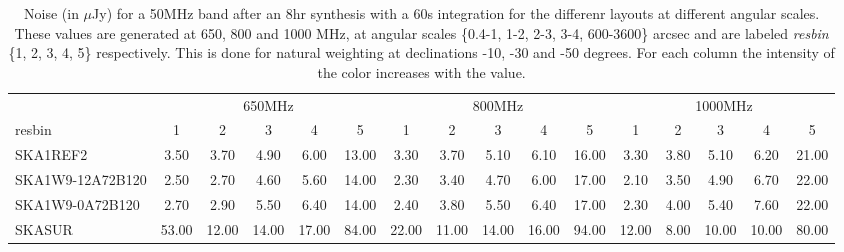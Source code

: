 \begin{table}[!htp]
{{\begin{tabular}{|lccccc||ccccc||ccccc|}
 \tabularnewline \cline{2-16} \multicolumn{1}{c}{ } & \multicolumn{5}{|c}{650MHz}  & \multicolumn{5}{c}{800MHz}  & \multicolumn{5}{c|}{1000MHz} \tabularnewline \cline{1-16} 
 resbin  &1 & 2 & 3 & 4 & 5 & 1 & 2 & 3 & 4 & 5 & 1 & 2 & 3 & 4 & 5 \tabularnewline \hline
SKA1REF2 & 3.50 \cellcolor{blue!18.83} & 3.70 \cellcolor{red!22.52} & 4.90 \cellcolor{green!19.34} & 6.00 \cellcolor{orange!19.47} & 13.00 \cellcolor{purple!18.00} & 3.30 \cellcolor{blue!20.13} & 3.70 \cellcolor{red!19.66} & 5.10 \cellcolor{green!19.81} & 6.10 \cellcolor{orange!18.42} & 16.00 \cellcolor{purple!18.00} & 3.30 \cellcolor{blue!23.09} & 3.80 \cellcolor{red!20.80} & 5.10 \cellcolor{green!19.65} & 6.20 \cellcolor{orange!18.00} & 21.00 \cellcolor{purple!18.00}\\ \hline 
SKA1W9-12A72B120 & 2.50 \cellcolor{blue!18.00} & 2.70 \cellcolor{red!18.00} & 4.60 \cellcolor{green!18.00} & 5.60 \cellcolor{orange!18.00} & 14.00 \cellcolor{purple!18.59} & 2.30 \cellcolor{blue!18.00} & 3.40 \cellcolor{red!18.00} & 4.70 \cellcolor{green!18.00} & 6.00 \cellcolor{orange!18.00} & 17.00 \cellcolor{purple!18.54} & 2.10 \cellcolor{blue!18.00} & 3.50 \cellcolor{red!18.00} & 4.90 \cellcolor{green!18.00} & 6.70 \cellcolor{orange!23.53} & 22.00 \cellcolor{purple!18.71}\\ \hline 
SKA1W9-0A72B120 & 2.70 \cellcolor{blue!18.17} & 2.90 \cellcolor{red!18.90} & 5.50 \cellcolor{green!22.02} & 6.40 \cellcolor{orange!20.95} & 14.00 \cellcolor{purple!18.59} & 2.40 \cellcolor{blue!18.21} & 3.80 \cellcolor{red!20.21} & 5.50 \cellcolor{green!21.61} & 6.40 \cellcolor{orange!19.68} & 17.00 \cellcolor{purple!18.54} & 2.30 \cellcolor{blue!18.85} & 4.00 \cellcolor{red!22.67} & 5.40 \cellcolor{green!22.12} & 7.60 \cellcolor{orange!33.47} & 22.00 \cellcolor{purple!18.71}\\ \hline 
SKASUR & 53.00 \cellcolor{blue!60.00} & 12.00 \cellcolor{red!60.00} & 14.00 \cellcolor{green!60.00} & 17.00 \cellcolor{orange!60.00} & 84.00 \cellcolor{purple!60.00} & 22.00 \cellcolor{blue!60.00} & 11.00 \cellcolor{red!60.00} & 14.00 \cellcolor{green!60.00} & 16.00 \cellcolor{orange!60.00} & 94.00 \cellcolor{purple!60.00} & 12.00 \cellcolor{blue!60.00} & 8.00 \cellcolor{red!60.00} & 10.00 \cellcolor{green!60.00} & 10.00 \cellcolor{orange!60.00} & 80.00 \cellcolor{purple!60.00}\tabularnewline \hline 
\end{tabular}}\hfil 

\caption{Noise (in $\mu$Jy) for a 50MHz band after an 8hr synthesis with a 60s integration for the differenr layouts at different angular scales. These values are generated at 650, 800 and 1000 MHz, at angular scales \{0.4-1, 1-2, 2-3, 3-4, 600-3600\} arcsec and are labeled {\it resbin} \{1, 2, 3, 4, 5\} respectively. This is done for natural weighting at declinations -10, -30 and -50 degrees. For each column the intensity of the color increases with the value.}\label{tab:noise50-band1}}
 \end{table}